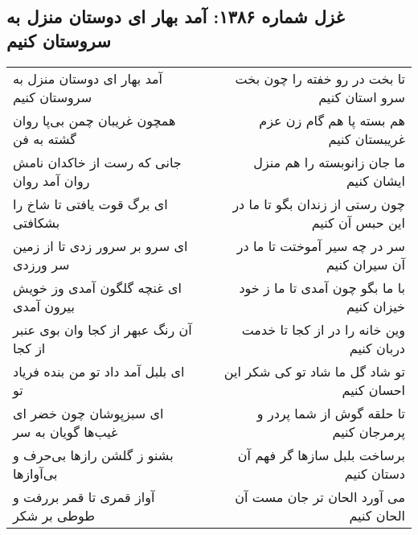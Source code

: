 \begin{center}
\section*{غزل شماره ۱۳۸۶: آمد بهار ای دوستان منزل به سروستان کنیم}
\label{sec:1386}
\begin{longtable}{l p{0.5cm} r}
آمد بهار ای دوستان منزل به سروستان کنیم
&&
تا بخت در رو خفته را چون بخت سرو استان کنیم
\\
همچون غریبان چمن بی‌پا روان گشته به فن
&&
هم بسته پا هم گام زن عزم غریبستان کنیم
\\
جانی که رست از خاکدان نامش روان آمد روان
&&
ما جان زانوبسته را هم منزل ایشان کنیم
\\
ای برگ قوت یافتی تا شاخ را بشکافتی
&&
چون رستی از زندان بگو تا ما در این حبس آن کنیم
\\
ای سرو بر سرور زدی تا از زمین سر ورزدی
&&
سر در چه سیر آموختت تا ما در آن سیران کنیم
\\
ای غنچه گلگون آمدی وز خویش بیرون آمدی
&&
با ما بگو چون آمدی تا ما ز خود خیزان کنیم
\\
آن رنگ عبهر از کجا وان بوی عنبر از کجا
&&
وین خانه را در از کجا تا خدمت دربان کنیم
\\
ای بلبل آمد داد تو من بنده فریاد تو
&&
تو شاد گل ما شاد تو کی شکر این احسان کنیم
\\
ای سبزپوشان چون خضر ای غیب‌ها گویان به سر
&&
تا حلقه گوش از شما پردر و پرمرجان کنیم
\\
بشنو ز گلشن رازها بی‌حرف و بی‌آوازها
&&
برساخت بلبل سازها گر فهم آن دستان کنیم
\\
آواز قمری تا قمر بررفت و طوطی بر شکر
&&
می آورد الحان تر جان مست آن الحان کنیم
\\
\end{longtable}
\end{center}
